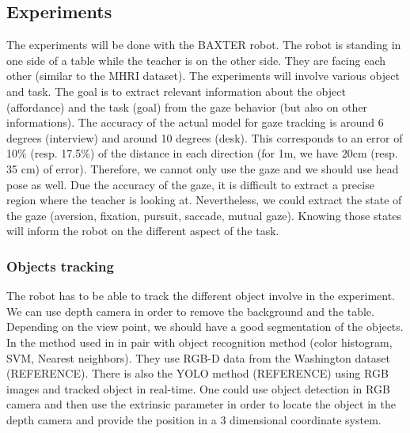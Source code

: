 \documentclass[11pt,a4paper]{article}
\begin{document}
\subsection{Experiments}
The experiments will be done with the BAXTER robot. The robot is standing in one side of a table while the teacher is on the other side. They are facing each other (similar to the MHRI dataset). The experiments will involve various object and task. The goal is to extract relevant information about the object (affordance) and the task (goal) from the gaze behavior (but also on other informations). The accuracy of the actual model for gaze tracking is around 6 degrees (interview) and around 10 degrees (desk). This corresponds to an error of 10\% (resp. 17.5\%) of the distance in each direction (for 1m, we have 20cm (resp. 35 cm) of error). Therefore, we cannot only use the gaze and we should use head pose as well. Due the accuracy of the gaze, it is difficult to extract a precise region where the teacher is looking at. Nevertheless, we could extract the state of the gaze (aversion, fixation, pursuit, saccade, mutual gaze). Knowing those states will inform the robot on the different aspect of the task.
\subsubsection{Objects tracking}
The robot has to be able to track the different object involve in the experiment. We can use depth camera in order to remove the background and the table. Depending on the view point, we should have a good segmentation of the objects. In the method used in \cite{Azagra2017} in pair with object recognition method (color histogram, SVM, Nearest neighbors). They use RGB-D data from the Washington dataset (REFERENCE). There is also the YOLO method (REFERENCE) using RGB images and tracked object in real-time. One could use object detection in RGB camera and then use the extrinsic parameter in order to locate the object in the depth camera and provide the position in a 3 dimensional coordinate system. 
\end{document}
